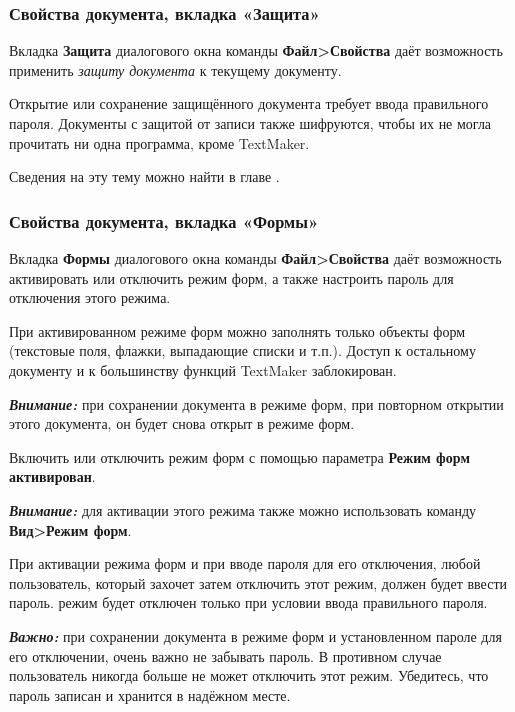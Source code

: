 ﻿\documentclass[a4paper,10pt]{article}
\begin{document}
 \subsubsection{Свойства документа, вкладка «Защита»}
 Вкладка \textbf{Защита} диалогового окна команды \textbf{Файл>Свойства} даёт возможность применить \textit{защиту документа} к текущему документу.
 
 Открытие или сохранение защищённого документа требует ввода правильного пароля. Документы с защитой от записи также шифруются, чтобы их не могла прочитать ни одна программа, кроме TextMaker.
 
 Сведения на эту тему можно найти в главе .
 
 \subsubsection{Свойства документа, вкладка «Формы»}
 Вкладка \textbf{Формы} диалогового окна команды \textbf{Файл>Свойства} даёт возможность активировать или отключить режим форм, а также настроить пароль для отключения этого режима.
 
 При активированном режиме форм можно заполнять только объекты форм (текстовые поля, флажки, выпадающие списки и т.п.). Доступ к остальному документу и к большинству функций TextMaker заблокирован.
 
 \begin{mdframed}[backgroundcolor=blue!10]
\textbf{\textit{Внимание:}} при сохранении документа в режиме форм, при повторном открытии этого документа, он будет снова открыт в режиме форм.
\end{mdframed}
 
 Включить или отключить режим форм с помощью параметра \textbf{Режим форм активирован}.
 
 \begin{mdframed}[backgroundcolor=blue!10]
\textbf{\textit{Внимание:}} для активации этого режима также можно использовать команду \textbf{Вид>Режим форм}.
\end{mdframed}
 
 При активации режима форм и при вводе пароля для его отключения, любой пользователь, который захочет затем отключить этот режим, должен будет ввести пароль. режим будет отключен только при условии ввода правильного пароля.
 
 \begin{mdframed}[backgroundcolor=blue!10]
\textbf{\textit{Важно:}} при сохранении документа в режиме форм и установленном пароле для его отключении, очень важно не забывать пароль. В противном случае пользователь никогда больше не может отключить этот режим. Убедитесь, что пароль записан и хранится в надёжном месте.
\end{mdframed}
 
\end{document}

